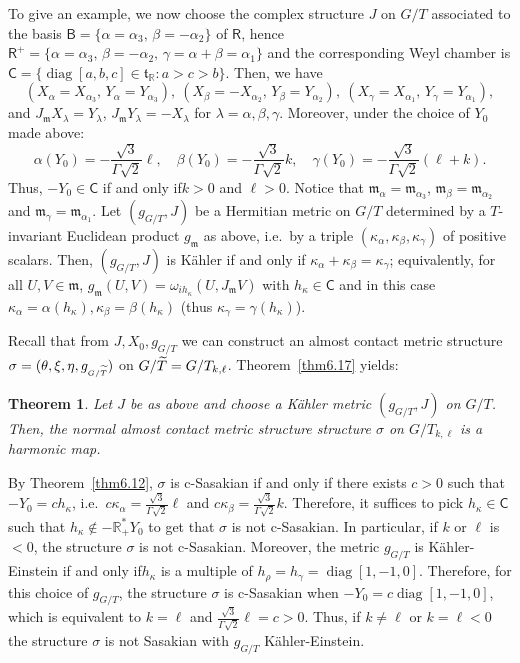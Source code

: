 \documentclass[a4paper,reqno]{amsart}
\newtheorem{thm}{Theorem}[section]
\theoremstyle{definition}
\theoremstyle{remark}
\theoremstyle{plain}
\numberwithin{equation}{section}
\newcommand{\R}{{\mathbb{R}}}
\newcommand{\fm}{{\mathfrak{m}}}
\newcommand{\ft}{{\mathfrak{t}}}
\newcommand{\Csf}{{\mathsf{C}}}
\def\diag{\operatorname {diag}}
\newcommand{\roots}{\mathsf{R}}
\newcommand{\proots}{\mathsf{R}^+}
\newcommand{\broots}{\mathsf{B}}
\newcommand{\kahler}{K\"ahler\xspace}
\newcommand{\sissi}{if and only if\xspace}
\newcommand{\NACMS}{normal almost contact metric
  structure\xspace}
\newcommand{\ACMS}{almost contact metric
  structure\xspace}
\newcommand{\txeMT}{{(\theta,\xi,\eta,g_{\scriptscriptstyle{G/\wT}})}}
\begin{document}
To give an example, we now choose the complex structure $J$ on $G/T$ associated to the
basis $\broots=\{\alpha = \alpha_3, \, \beta= -\alpha_2\}$ of
$\roots$, hence
$\proots=\{\alpha = \alpha_3, \, \beta= -\alpha_2, \, \gamma =
  \alpha+\beta= \alpha_1\}$
and the corresponding Weyl chamber is $\Csf =\{\diag[a,b,c] \in
\ft_\R : a > c > b\}$. 
Then, we have 
\[
  (X_\alpha = X_{\alpha_3},  \,Y_\alpha =Y_{\alpha_3}), \ (X_\beta = -X_{\alpha_2}, \,
  Y_\beta =Y_{\alpha_2}), \ (X_\gamma = X_{\alpha_1}, \, Y_\gamma
  = Y_{\alpha_1}),
\]
and $J_\fm X_\lambda= Y_\lambda$, $J_\fm Y_\lambda= -X_{\lambda}$
for $\lambda =\alpha,\beta,\gamma$. 
Moreover, under the choice of $Y_0$ made above:
\begin{equation*}
  \label{eq5.9}
  \alpha(Y_0) = -\frac{\sqrt{3}}{\Gamma\sqrt{2}}  \ell, \quad
  \beta(Y_0) = -\frac{\sqrt{3}}{\Gamma\sqrt{2}} k, \quad \gamma(Y_0)=
  -\frac{\sqrt{3}}{\Gamma\sqrt{2}} (\ell +k).
\end{equation*}
Thus, $-Y_0 \in \Csf$ \sissi $k >0$ and $\ell >0$.
Notice that $\fm_\alpha= \fm_{\alpha_3}$,
$\fm_\beta = \fm_{\alpha_2}$ and $\fm_\gamma =
\fm_{\alpha_1}$. Let $(g_{\scriptscriptstyle{G/T}},J)$ be a Hermitian metric on $G/T$
determined by a $T$-invariant Euclidean product $g_\fm$ as
above, i.e.~by a triple
$(\kappa_\alpha,\kappa_\beta,\kappa_\gamma)$ of positive
scalars. Then, $(g_{\scriptscriptstyle{G/T}},J)$ is \kahler \sissi
$\kappa_\alpha + \kappa_\beta = \kappa_\gamma$; equivalently, for all $U,V \in \fm$,
$g_\fm(U,V) = \omega_{i h_\kappa}(U, J_\fm V)$%
with $h_\kappa \in \Csf$ and in this case
$\kappa_\alpha= \alpha(h_\kappa), \kappa_\beta = \beta(h_\kappa)$
(thus $\kappa_\gamma= \gamma(h_\kappa)$).


Recall that from $J,X_0,g_{\scriptscriptstyle{G/T}}$ we can construct an \ACMS
$\sigma = \txeMT$ on
$G/{\widetilde{T}}=G/T_{k,\ell}$.  Theorem~\ref{thm6.17} yields:

\begin{thm}
  \label{thm4.1a}
  Let $J$ be as above and choose a \kahler metric $(g_{\scriptscriptstyle{G/T}},J)$ on
  $G/T$. Then, the \NACMS structure $\sigma$ on $G/T_{k,\ell}$ is  a harmonic map.
\end{thm}

  By Theorem~\ref{thm6.12}, $\sigma$ is c-Sasakian \sissi there
  exists $c >0$ such that $- Y_0 = c h_\kappa$,
  i.e.~$c \kappa_\alpha= \frac{\sqrt{3}}{\Gamma \sqrt{2}} \ell$
  and $c\kappa_\beta= \frac{\sqrt{3}}{\Gamma \sqrt{2}}
  k$. Therefore, it suffices to pick $h_\kappa \in \Csf$ such
  that $h_\kappa \notin -\R_+^* Y_0$ to get that $\sigma$ is not
  c-Sasakian.  In particular, if $k$ or $\ell$ is $<0$, the
  structure $\sigma$ is not c-Sasakian. Moreover, the metric
  $g_{\scriptscriptstyle{G/T}}$ is \kahler-Einstein \sissi $h_{\kappa}$ is a multiple
  of $h_\rho = h_\gamma = \diag[1,-1,0]$. Therefore, for this
  choice of $g_{\scriptscriptstyle{G/T}}$, the structure $\sigma$ is c-Sasakian when
  $-Y_0 = c\diag[1,-1,0]$, which is equivalent to $k =\ell$ and
  $\frac{\sqrt{3}}{\Gamma\sqrt{2}} \ell = c >0$. Thus, if
  $k \neq \ell$ or $k =\ell < 0$ the structure $\sigma$ is not
  Sasakian with $g_{\scriptscriptstyle{G/T}}$ \kahler-Einstein.
 
\end{document}
